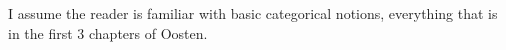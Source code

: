 I assume the reader is familiar with basic categorical notions, 
everything that is in the first 3 chapters of Oosten.

